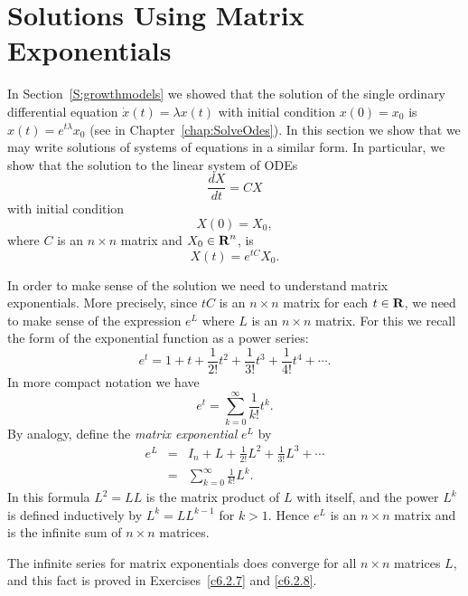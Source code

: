 \section{Solutions Using Matrix Exponentials}
\label{S:Matrixexp} 

In Section~\ref{S:growthmodels} we showed that the solution of the single
ordinary differential equation $\dot x(t) = \lambda x(t)$ with initial
condition $x(0)=x_0$ is $x(t) = e^{t\lambda}x_0$ (see  in
Chapter~\ref{chap:SolveOdes}).  In this section we show that we
may write solutions of systems of equations in a similar form.
In particular, we show that the solution to the linear system of ODEs
\begin{equation}   \label{eq:x=Mx}
\frac{dX}{dt} = CX
\end{equation}
with initial condition
\[
X(0) = X_0,
\]
where $C$ is an $n\times n$ matrix and $X_0\in\mbox{$\bf{R}$}^n$, is
\begin{equation}  \label{matrixsoln}
X(t) = e^{tC}X_0.
\end{equation}

In order to make sense of the solution  we need
to understand matrix exponentials. More precisely, since $tC$ is
an $n\times n$ matrix for each $t\in\mbox{$\bf{R}$}$, we need to make sense
of the expression $e^L$ where $L$ is an $n\times n$ matrix.  For
this we recall the form of the exponential function as a power
series:
\[
     e^t = 1 + t + \frac{1}{2!} t^2 + \frac{1}{3!} t^3
     + \frac{1}{4!} t^4 + \cdots .
\]
In more compact notation we have
\[
     e^t = \sum\limits_{k=0}^\infty \frac{1}{k!} t^k.
\]
By analogy, define the {\em matrix exponential\/}
$e^L$ by
\begin{eqnarray}
e^{L} & = & I_n + L + \frac{1}{2!} L^2 + \frac{1}{3!} L^3 +\cdots
\label{e:expL}\\
      & = & \sum\limits_{k=0}^\infty\frac{1}{k!} L^k. \nonumber
\end{eqnarray}
In this formula $L^2 = LL$ is the matrix product of $L$ with itself, and the
power $L^k$ is defined inductively by $L^k = LL^{k-1}$ for $k>1$.  Hence
$e^L$ is an $n\times n$ matrix and is the infinite sum of $n\times n$
matrices.

   The infinite series for matrix exponentials
 does converge for all $n\times n$ matrices $L$, and this fact
is proved in Exercises~\ref{c6.2.7} and \ref{c6.2.8}.

